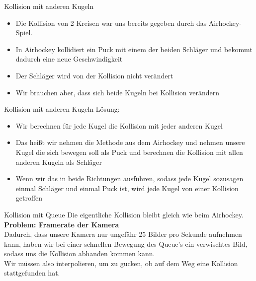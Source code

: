 \begin{frame}{Kollision mit anderen Kugeln}
\begin{itemize}
	\item Die Kollision von 2 Kreisen war uns bereits gegeben durch das Airhockey-Spiel.
	\item In Airhockey kollidiert ein Puck mit einem der beiden Schläger und bekommt dadurch eine neue Geschwindigkeit
	\item Der Schläger wird von der Kollision nicht verändert
	\item Wir brauchen aber, dass sich beide Kugeln bei Kollision verändern
\end{itemize}
\end{frame}
\begin{frame}{Kollision mit anderen Kugeln}
Lösung:
\begin{itemize}
	\item Wir berechnen für jede Kugel die Kollision mit jeder anderen Kugel
	\item Das heißt wir nehmen die Methode aus dem Airhockey und nehmen unsere Kugel die sich bewegen soll als Puck und berechnen die Kollision mit allen anderen Kugeln als Schläger
	\item Wenn wir das in beide Richtungen ausführen, sodass jede Kugel sozusagen einmal Schläger und einmal Puck ist, wird jede Kugel von einer Kollision getroffen 
\end{itemize}
\end{frame}
\begin{frame}{Kollision mit Queue}
Die eigentliche Kollision bleibt gleich wie beim Airhockey. \\
\textbf{Problem: Framerate der Kamera} \\
Dadurch, dass unsere Kamera nur ungefähr 25 Bilder pro Sekunde aufnehmen kann, haben wir bei einer schnellen Bewegung des Queue's ein verwischtes Bild, sodass uns die Kollision abhanden kommen kann. \\
Wir müssen also interpolieren, um zu gucken, ob auf dem Weg eine Kollision stattgefunden hat.
\end{frame}